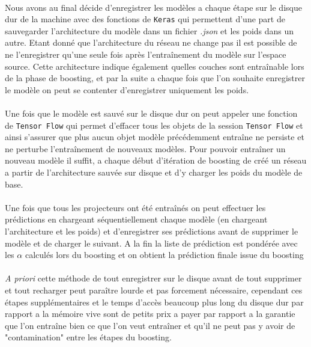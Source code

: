 \documentclass[11 pt]{article}
\begin{document}
\paragraph{}Nous avons au final décide d'enregistrer les modèles a chaque étape sur le disque dur de la machine avec des fonctions de \texttt{Keras} qui permettent d'une part de sauvegarder l'architecture du modèle dans un fichier \emph{.json} et les poids dans un autre. Etant donné que l'architecture du réseau ne change pas il est possible de ne l'enregistrer qu'une seule fois après l’entraînement du modèle sur l'espace source. Cette architecture indique également quelles couches sont entraînable lors de la phase de boosting, et par la suite a chaque fois que l'on souhaite enregistrer le modèle on peut se contenter d'enregistrer uniquement les poids. 

\paragraph{}Une fois que le modèle est sauv\'e sur le disque dur on peut appeler une fonction de \texttt{Tensor Flow} qui permet d'effacer tous les objets de la session \texttt{Tensor Flow} et ainsi s'assurer que plus aucun objet modèle précédemment entraîne ne persiste et ne perturbe l’entraînement de nouveaux modèles. Pour pouvoir entraîner un nouveau modèle il suffit, a chaque début d’itération de boosting de créé un réseau a partir de l'architecture sauvée sur disque et d'y charger les poids du modèle de base.

\paragraph{} Une fois que tous les projecteurs ont été entraînés on peut effectuer les prédictions en chargeant séquentiellement chaque modèle (en chargeant l'architecture et les poids) et d'enregistrer ses prédictions avant de supprimer le modèle et de charger le suivant. A la fin la liste de prédiction est pondérée avec les $\alpha$ calcul\'es lors du boosting et on obtient la prédiction finale issue du boosting

\paragraph{} \emph{A priori} cette méthode de tout enregistrer sur le disque avant de tout supprimer et tout recharger peut paraître lourde et pas forcement nécessaire, cependant ces étapes supplémentaires et le temps d’accès beaucoup plus long du disque dur par rapport a la mémoire vive sont de petits prix a payer par rapport a la garantie que l'on entraîne bien ce que l'on veut entraîner et qu'il ne peut pas y avoir de "contamination" entre les étapes du boosting. 
\end{document}
